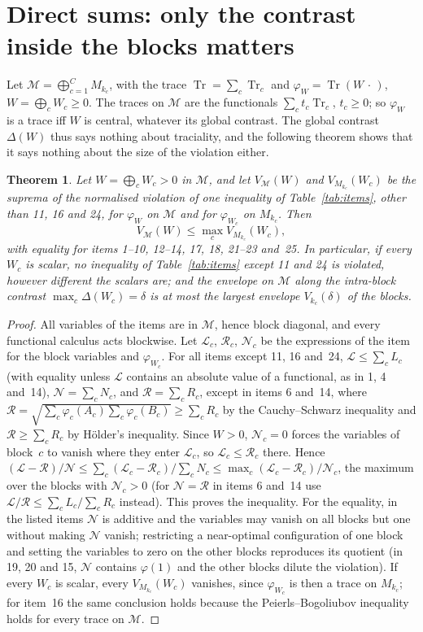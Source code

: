 \documentclass[11pt]{article}
\DeclareMathOperator{\Tr}{Tr}
\newcommand{\M}{\mathcal{M}}
\newcommand{\cL}{\mathcal{L}}
\newcommand{\cR}{\mathcal{R}}
\newcommand{\cN}{\mathcal{N}}
\theoremstyle{plain}
\newtheorem{theorem}{Theorem}[section]
\theoremstyle{definition}
\theoremstyle{remark}
\begin{document}
\section{Direct sums: only the contrast inside the blocks matters}\label{sec:sectors}

Let $\M=\bigoplus_{c=1}^CM_{k_c}$, with the trace $\Tr=\sum_c\Tr_c$ and $\varphi_W=\Tr(W\,\cdot\,)$, $W=\bigoplus_cW_c\ge0$. The
traces on $\M$ are the functionals $\sum_ct_c\Tr_c$, $t_c\ge0$; so $\varphi_W$ is a trace iff $W$ is central, whatever its
global contrast. The global contrast $\Delta(W)$ thus says nothing about traciality, and the following theorem shows that
it says nothing about the size of the violation either.

\begin{theorem}\label{thm:sectors}
Let $W=\bigoplus_cW_c>0$ in $\M$, and let $V_\M(W)$ and $V_{M_{k_c}}(W_c)$ be the suprema of the normalised violation of
one inequality of Table~\ref{tab:items}, other than 11, 16 and 24, for $\varphi_W$ on $\M$ and for $\varphi_{W_c}$ on
$M_{k_c}$. Then
\[
  V_\M(W)\le\max_cV_{M_{k_c}}(W_c),
\]
with equality for items 1--10, 12--14, 17, 18, 21--23 and~25. In particular, if every $W_c$ is scalar, no inequality of
Table~\ref{tab:items} except 11 and 24 is violated, however different the scalars are; and the envelope on $\M$ along
the intra-block contrast $\max_c\Delta(W_c)=\delta$ is at most the largest envelope $V_{k_c}(\delta)$ of the blocks.
\end{theorem}
\begin{proof}
All variables of the items are in $\M$, hence block diagonal, and every functional calculus acts blockwise. Let $\cL_c$,
$\cR_c$, $\cN_c$ be the expressions of the item for the block variables and $\varphi_{W_c}$. For all items except 11, 16 and~24,
$\cL\le\sum_cL_c$ (with equality unless $\cL$ contains an absolute value of a functional, as in 1, 4 and~14),
$\cN=\sum_cN_c$, and $\cR=\sum_cR_c$, except in items 6 and~14, where $\cR=\sqrt{\sum_c\varphi_c(A_c)\sum_c\varphi_c(B_c)}\ge
\sum_cR_c$ by the Cauchy--Schwarz inequality and $\cR\ge\sum_cR_c$ by Hölder's inequality. Since $W>0$, $\cN_c=0$ forces the
variables of block~$c$ to vanish where they enter $\cL_c$, so $\cL_c\le \cR_c$ there. Hence
$(\cL-\cR)/\cN\le\sum_c(\cL_c-\cR_c)/\sum_cN_c\le\max_c(\cL_c-\cR_c)/\cN_c$, the maximum over the blocks with $\cN_c>0$ (for $\cN=\cR$ in items 6
and~14 use $\cL/\cR\le\sum_cL_c/\sum_cR_c$ instead). This proves the inequality. For the equality, in the
listed items $\cN$ is additive and the variables may vanish on all blocks but one without making $\cN$ vanish; restricting a
near-optimal configuration of one block and setting the variables to zero on the other blocks reproduces its quotient
(in 19, 20 and 15, $\cN$ contains $\varphi(1)$ and the other blocks dilute the violation). If every $W_c$ is scalar, every
$V_{M_{k_c}}(W_c)$ vanishes, since $\varphi_{W_c}$ is then a trace on $M_{k_c}$; for item~16 the same conclusion holds
because the Peierls--Bogoliubov inequality holds for every trace on $\M$.
\end{proof}
\end{document}
